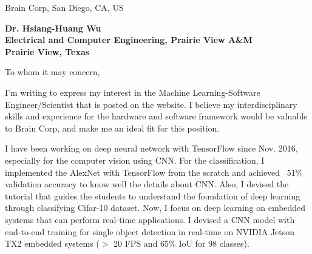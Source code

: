 \documentclass[12pt]{letter} %
\newcounter{comment}
\begin{document}

\begin{letter}{Brain Corp, San Diego, CA, US} 


\begin{center}
\large\bf Dr. Hsiang-Huang Wu\\ %
Electrical and Computer Engineering, Prairie View A\&M \\ 
Prairie View, Texas %
\end{center} 
\vfill

\signature{Hsiang-Huang Wu} %


\opening{To whom it may concern,} 

I'm writing to express my interest in the Machine Learning-Software Engineer/Scientist that is posted on the website.
I believe my interdisciplinary skills and experience for the hardware and software framework would be valuable to 
Brain Corp, and make me an ideal fit for this position.

I have been working on deep neural network with TensorFlow since Nov. 2016, especially for
the computer vision using CNN.  For the classification, I implemented the AlexNet with TensorFlow from the scratch
and achieved ~51\% validation accuracy to know well the details about CNN.  Also, I devised the tutorial that
guides the students to understand the foundation of deep learning through classifying Cifar-10 dataset.
Now, I focus on deep learning on embedded systems that can perform real-time applications.
I devised a CNN model with end-to-end training for single object detection in real-time on NVIDIA
Jetson TX2 embedded systems ($>$ 20 FPS and 65\% IoU for 98 classes).


\end{letter}
\end{document}
